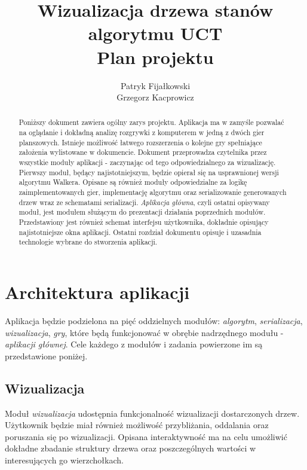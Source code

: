 \documentclass{article}
\title{
	Wizualizacja drzewa stanów algorytmu UCT \\
	\large Plan projektu}
\author{Patryk Fijałkowski \\ Grzegorz Kacprowicz}
\let\oldsection\section
\renewcommand\section{\clearpage\oldsection}
\newcommand{\modulename}[1]{\textit{#1}}
\begin{document}
	\begin{titlingpage}
		\maketitle
		\vspace{3cm}
		\begin{abstract}
			Poniższy dokument zawiera ogólny zarys projektu. Aplikacja ma w zamyśle pozwalać na oglądanie i dokładną analizę rozgrywki z komputerem w jedną z dwóch gier planszowych. Istnieje możliwość łatwego rozszerzenia o kolejne gry spełniające założenia wylistowane w dokumencie. Dokument przeprowadza czytelnika przez wszystkie moduły aplikacji - zaczynając od tego odpowiedzialnego za wizualizację. Pierwszy moduł, będący najistotniejszym, będzie opierał się na usprawnionej wersji algorytmu Walkera. Opisane są również moduły odpowiedzialne za logikę zaimplementowanych gier, implementację algorytmu oraz serializowanie generowanych drzew wraz ze schematami serializacji. \modulename{Aplikacja główna}, czyli ostatni opisywany moduł, jest modułem służącym do prezentacji działania poprzednich modułów. Przedstawiony jest również schemat interfejsu użytkownika, dokładnie opisujący najistotniejsze okna aplikacji. Ostatni rozdział dokumentu opisuje i uzasadnia technologie wybrane do stworzenia aplikacji.
		\end{abstract}
	\end{titlingpage}

	\begin{versionhistory}
	\end{versionhistory}
	\tableofcontents
	
	\section{Architektura aplikacji}
	Aplikacja będzie podzielona na pięć oddzielnych modułów: \modulename{algorytm}, \modulename{serializacja}, \modulename{wizualizacja}, \modulename{gry}, które będą funkcjonować w obrębie nadrzędnego modułu - \modulename{aplikacji głównej}. Cele każdego z modułów i zadania powierzone im są przedstawione poniżej.
	
	\subsection{Wizualizacja}
	Moduł \modulename{wizualizacja} udostępnia funkcjonalność wizualizacji dostarczonych drzew. Użytkownik będzie miał również możliwość przybliżania, oddalania oraz poruszania się po wizualizacji. Opisana interaktywność ma na celu umożliwić dokładne zbadanie struktury drzewa oraz poszczególnych wartości w interesujących go wierzchołkach. \\
	
\end{document}

